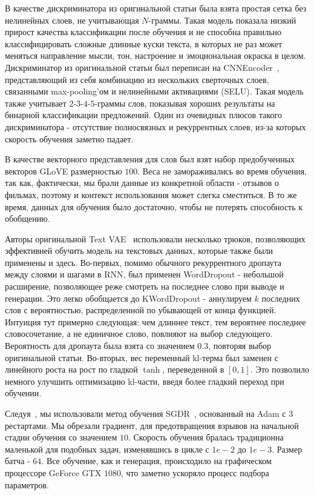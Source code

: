\documentclass{spbau-diploma}
\begin{document}
В качестве дискриминатора из оригинальной статьи была взята простая сетка без
нелинейных слоев, не учитывающая $N$-граммы. Такая модель показала низкий 
прирост качества классификации после обучения и не способна правильно 
классифицировать сложные длинные куски текста, в которых не раз может меняться
направление мысли, тон, настроение и эмоциональная окраска в целом.
Дискриминатор из оригинальной статьи был переписан на 
CNNEncoder~\cite{1510.03820}, представляющий из себя комбинацию из нескольких 
сверточных слоев, связанными max-pooling'ом и нелинейными активациями (SELU). 
Такая модель также учитывает $2$-$3$-$4$-$5$-граммы слов, показывая хороших 
результаты на бинарной классификации предложений. Один из очевидных плюсов 
такого дискриминатора - отсутствие полносвязных и рекуррентных слоев, из-за 
которых скорость обучения заметно падает.

В качестве векторного представления для слов был взят набор предобученных
векторов GLoVE размерностью $100$. Веса не замораживались во время обучения,
так как, фактически, мы брали данные из конкретной области - отзывов о фильмах,
поэтому и контекст использования может слегка сместиться. В то же время, данных
для обучения было достаточно, чтобы не потерять способность к обобщению.

Авторы оригинальной Text VAE~\cite{text_vae} использовали несколько трюков, 
позволяющих эффективней обучить модель на текстовых данных, которые также были 
применены и здесь. Во-первых, помимо обычного рекуррентного 
дропаута~\cite{wiki:dropout} между слоями и шагами в RNN, был применен 
WordDropout - небольшой расширение, позволяющее реже смотреть на последнее 
слово при выводе и генерации. Это легко обобщается до KWordDropout - аннулируем
$k$ последних слов с вероятностью, распределенной по убывающей от конца 
функцией. Интуиция тут примерно следующая: чем длиннее текст, тем вероятнее 
последнее словосочетание, а не единичное слово, повлияют на выбор следующего. 
Вероятность для дропаута была взята со значением $0.3$, повторяя выбор 
оригинальной статьи. Во-вторых, вес переменный kl-терма был заменен с 
линейного роста на рост по гладкой $\tanh$, переведенной в $[0, 1]$. Это 
позволило немного улучшить оптимизацию kl-части, введя более гладкий переход 
при обучении.

Следуя~\cite{fastai}, мы использовали метод обучения 
SGDR~\cite{1608.03983}, основанный на Adam с $3$ рестартами. Мы обрезали 
градиент, для предотвращения взрывов на начальной стадии обучения со значением
$10$. Скорость обучения бралась традиционна маленькой для подобных задач, 
изменявшись в цикле с $1e-2$ до $1e-3$. Размер батча - $64$. Все обучение, как 
и генерация, происходило на графическом процессоре GeForce GTX $1080$, что
заметно ускоряло процесс подбора параметров.
\end{document}
